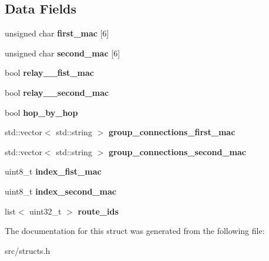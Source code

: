 \subsection*{Data Fields}
\begin{DoxyCompactItemize}
\item 
\hypertarget{structcr__entry_a8a5bb126342d63abf27eb962ae3d2cee}{unsigned char {\bfseries first\-\_\-mac} \mbox{[}6\mbox{]}}\label{structcr__entry_a8a5bb126342d63abf27eb962ae3d2cee}

\item 
\hypertarget{structcr__entry_a57e423df02542addb22a741b5deca298}{unsigned char {\bfseries second\-\_\-mac} \mbox{[}6\mbox{]}}\label{structcr__entry_a57e423df02542addb22a741b5deca298}

\item 
\hypertarget{structcr__entry_a038e4b52d4a909a1058668417ef1e8b1}{bool {\bfseries relay\-\_\-\_\-fist\-\_\-mac}}\label{structcr__entry_a038e4b52d4a909a1058668417ef1e8b1}

\item 
\hypertarget{structcr__entry_ab1fe080bfdd486e3ba16b8034f849e6e}{bool {\bfseries relay\-\_\-\_\-second\-\_\-mac}}\label{structcr__entry_ab1fe080bfdd486e3ba16b8034f849e6e}

\item 
\hypertarget{structcr__entry_a7fa35e8f1594178e0a3ff6d52a8c5f26}{bool {\bfseries hop\-\_\-by\-\_\-hop}}\label{structcr__entry_a7fa35e8f1594178e0a3ff6d52a8c5f26}

\item 
\hypertarget{structcr__entry_a8219b274eee48d23ff3cc7d7cea1d8ca}{std\-::vector$<$ std\-::string $>$ {\bfseries group\-\_\-connections\-\_\-first\-\_\-mac}}\label{structcr__entry_a8219b274eee48d23ff3cc7d7cea1d8ca}

\item 
\hypertarget{structcr__entry_a8d6a2a6bb3b0e8bbfe068fbb35fcec3a}{std\-::vector$<$ std\-::string $>$ {\bfseries group\-\_\-connections\-\_\-second\-\_\-mac}}\label{structcr__entry_a8d6a2a6bb3b0e8bbfe068fbb35fcec3a}

\item 
\hypertarget{structcr__entry_a92f4f3e9788073f796c6ddcadf32abae}{uint8\-\_\-t {\bfseries index\-\_\-fist\-\_\-mac}}\label{structcr__entry_a92f4f3e9788073f796c6ddcadf32abae}

\item 
\hypertarget{structcr__entry_a3ed45b5055f761686764255c79fbb174}{uint8\-\_\-t {\bfseries index\-\_\-second\-\_\-mac}}\label{structcr__entry_a3ed45b5055f761686764255c79fbb174}

\item 
\hypertarget{structcr__entry_a6e5025b111b254aa0e6eee4df15f7c40}{list$<$ uint32\-\_\-t $>$ {\bfseries route\-\_\-ids}}\label{structcr__entry_a6e5025b111b254aa0e6eee4df15f7c40}

\end{DoxyCompactItemize}


The documentation for this struct was generated from the following file\-:\begin{DoxyCompactItemize}
\item 
src/structs.\-h\end{DoxyCompactItemize}
